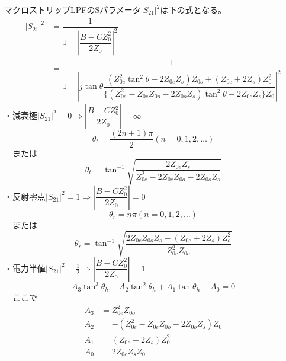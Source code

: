 \documentclass[12pt, fleqn]{jsarticle}
\begin{document}
マクロストリップLPFのSパラメータ$|S_{21}|^2$は下の式となる。
\begin{equation}
  \begin{aligned}
    |S_{21}|^2 &= \dfrac{1}{1+\left|\dfrac{B-CZ^2_0}{2Z_0}\right|^2} \\
    &= \dfrac{1}{1+\left|{j\tan\theta
          \dfrac{(Z^2_{0e}\tan^2\theta-2Z_{0e}Z_s)Z_{0o}+(Z_{0e}+2Z_s)Z^2_0}
          {\{(Z^2_{0e}-Z_{0e}Z_{0o}-2Z_{0o}Z_s)\tan^2\theta-2Z_{0e}Z_s\}Z_0}}\right|^2}
  \end{aligned}
\end{equation}
・減衰極$|S_{21}|^2 = 0 \Rightarrow \left|\dfrac{B-CZ_0^2}{2Z_0}\right| = \infty$
\begin{equation*}
  \theta_t = \frac{(2n+1)\pi}{2}(n=0,1,2,\dots)
\end{equation*}
　または
\begin{equation*}
  \theta_t = \tan^{-1}\sqrt{\dfrac{2Z_{0e}Z_s}{Z_{0e}^2-2Z_{0e}Z_{0o}-2Z_{0o}Z_s}}
\end{equation*}
・反射零点$|S_{21}|^2 = 1 \Rightarrow \left|\dfrac{B-CZ_0^2}{2Z_0}\right| = 0$
\begin{equation}
  \theta_r = n\pi(n=0,1,2,\dots)
\end{equation}
　または
\begin{equation}
  \theta_r = \tan^{-1}\sqrt{\dfrac{2Z_{0e}Z_{0o}Z_s-(Z_{0e}+2Z_s)Z_o^2}{Z_{0e}^2Z_{0o}}}
\end{equation}
・電力半値$|S_{21}|^2 = \frac{1}{2} \Rightarrow \left|\dfrac{B-CZ_0^2}{2Z_0}\right| = 1$
\begin{equation}
  A_3\tan^3\theta_h + A_2\tan^2\theta_h+A_1\tan\theta_h+A_0 = 0
\end{equation}
　ここで
\begin{equation*}
  \begin{split}
    A_3 &= Z_{0e}^2Z_{0o} \\
    A_2 &= -(Z_{0e}^2-Z_{0e}Z_{0o}-2Z_{0o}Z_s)Z_0 \\
    A_1 &= (Z_{0e}+2Z_s)Z_{0}^2 \\
    A_0 &= 2Z_{0e}Z_sZ_0
  \end{split}
\end{equation*}
\newpage{}
\end{document}
